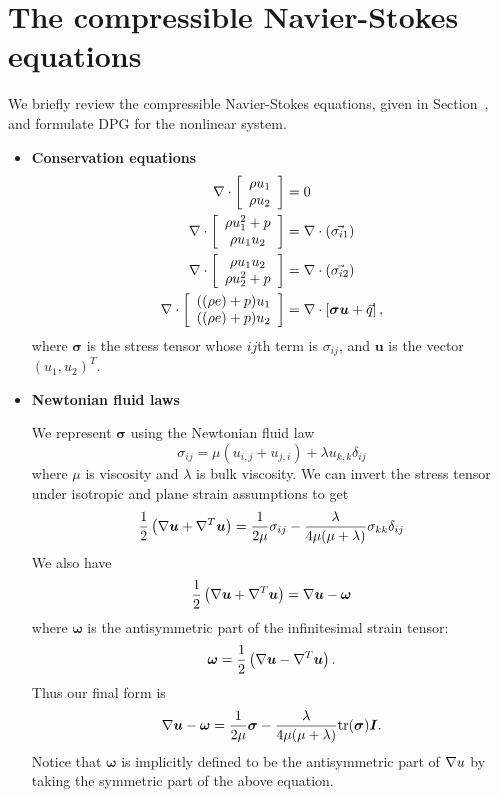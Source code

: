 \section{The compressible Navier-Stokes equations}

We briefly review the compressible Navier-Stokes equations, given in Section~, and formulate DPG for the nonlinear system. 
\begin{itemize}
\item \textbf{Conservation equations}
\begin{align*}
\div \vecttwo{\rho u_1 }{\rho u_2} &= 0\\
\div \vecttwo{\rho u_1^2+p }{\rho u_1 u_2} &= \div\left(\vec{\sigma_{i1}}\right)\\
\div \vecttwo{\rho u_1 u_2}{\rho u_2^2+p } &= \div\left(\vec{\sigma_{i2}}\right)\\
\div\vecttwo{((\rho e)+p)u_1}{((\rho e)+p)u_2} &= \div\left[\boldsymbol\sigma \boldsymbol u + \vec{q}\right],
\end{align*}
where $\boldsymbol \sigma$ is the stress tensor whose $ij$th term is $\sigma_{ij}$, and $\boldsymbol u$ is the vector $(u_1,u_2)^T$.  

\item \textbf{Newtonian fluid laws}

We represent $\boldsymbol\sigma$ using the Newtonian fluid law
\[
\sigma_{ij} = \mu(u_{i,j} + u_{j,i}) + \lambda u_{k,k} \delta_{ij}
\]
where $\mu$ is viscosity and $\lambda$ is bulk viscosity. 
We can invert the stress tensor under isotropic and plane strain assumptions to get
\[
\frac{1}{2}\left(\grad  \boldsymbol u + \grad ^T  \boldsymbol u\right) = \frac{1}{2\mu} \sigma_{ij} - \frac{\lambda}{4\mu (\mu + \lambda)} \sigma_{kk}\delta_{ij}
\]
We also have
\[
\frac{1}{2}\left(\grad  \boldsymbol u + \grad ^T  \boldsymbol u\right) = \grad  \boldsymbol u - \boldsymbol \omega
\]
where $\boldsymbol \omega$ is the antisymmetric part of the infinitesimal strain tensor:
\[
\boldsymbol \omega = \frac{1}{2}\left(\grad  \boldsymbol u - \grad ^T  \boldsymbol u\right).
\]
Thus our final form is
\begin{align*}
\grad  \boldsymbol u - \boldsymbol \omega = \frac{1}{2\mu} \boldsymbol \sigma - \frac{\lambda}{4\mu (\mu + \lambda)} { \rm tr}(\boldsymbol \sigma) \boldsymbol I.
\end{align*}
Notice that $\boldsymbol \omega$ is implicitly defined to be the antisymmetric part of $\grad u$ by taking the symmetric part of the above equation. 


\end{itemize}
